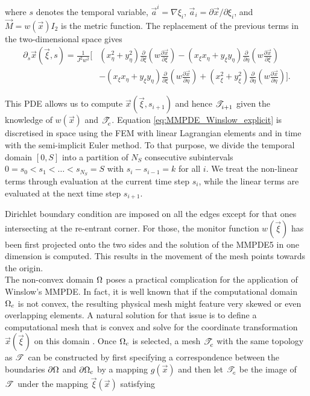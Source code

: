 \documentclass[a4paper,11pt]{article}
\begin{document}
{where $s$ denotes the temporal variable, $\vec a^{i} = \nabla \xi_{i}$, $\vec a_{i} = \partial \vec{x}/\partial\xi_{i}$, and $\vec M = w(\vec{x})I_{2}$ is the metric function. The
replacement of the previous terms in the two-dimensional space gives
\begin{equation}
\begin{split}
  \partial_s \vec{x}(\vec{\xi},s)
  =
  \frac{1}{J^{2} w^{2}} \Bigg[& (x_{\eta}^{2} + y_{\eta}^{2})  \frac{\partial}{\partial \xi} \left(w \frac{\partial \vec{x}}{\partial \xi} \right) - (x_{\xi}x_{\eta} + y_{\xi}y_{\eta})\frac{\partial}{\partial \eta} \left( w \frac{\partial \vec{x}}{\partial \xi} \right)\\
      &-(x_{\xi}x_{\eta} + y_{\xi}y_{\eta})\frac{\partial}{\partial \xi} \left(w \frac{\partial \vec{x}}{\partial \eta} \right) + (x_{\xi}^{2} + y_{\xi}^{2})\frac{\partial}{\partial \eta}  \left( w\frac{\partial \vec{x}}{\partial \eta} \right) \Bigg].
\end{split}
\label{eq:MMPDE_Winslow_explicit}
\end{equation}

This PDE allows us to compute $\vec{x}(\vec{\xi},s_{i+1})$ and hence $\mathscr T^{}_{i+1}$ given the knowledge of $w(\vec{x})$ and $\mathscr T^{}_{c}$. Equation \eqref{eq:MMPDE_Winslow_explicit} is discretised in space using the FEM with linear Lagrangian elements and in time with the semi-implicit Euler method. To that purpose, we divide the temporal domain $[0,S]$ into a partition of $N_S$ consecutive subintervals $0=s_0 < s_1 < \dots < s_{N_S} = S$ with $s_i - s_{i-1} = k$ for all $i$. We treat the non-linear terms through evaluation at the current time step $s_i$, while the linear terms are evaluated at the next time step $s_{i+1}$.

Dirichlet boundary condition are imposed on all the edges except for that ones intersecting at the re-entrant corner. For those, the monitor function $w(\vec{\xi})$ has been first projected onto the two sides and the solution of the MMPDE5 \cite{HR:2011} in one dimension is computed. This results in the movement of the mesh points towards the origin.\\


The non-convex domain $\Omega$ poses a practical complication for the application of Winslow's MMPDE. In fact, it is well known that if the computational domain $\Omega_{c}$ is not convex, the resulting physical mesh might feature very skewed or even overlapping elements. A natural solution for that issue is to define a computational mesh that is convex and solve for the coordinate transformation $\vec{x}(\vec{\xi})$ on this domain \cite{CHR:1999,LTZ:2001}. Once $\Omega_c$ is selected, a mesh $\mathscr T^{}_{c}$ with the same topology as $\mathscr T^{}$ can be constructed by first specifying a correspondence between the boundaries $\partial \Omega$ and $\partial \Omega_{c}$ by a mapping $g(\vec{x})$ and then let  $\mathscr T^{}_{c}$ be the image of $\mathscr T^{}$ under the mapping $\vec{\xi}(\vec{x})$ satisfying


}
\end{document}
